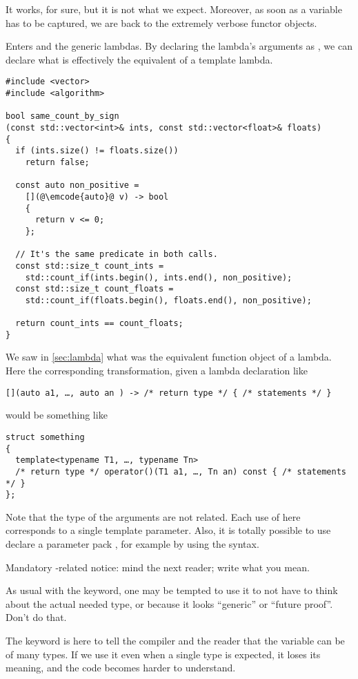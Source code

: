 It works, for sure, but it is not what we expect. Moreover, as soon as
a variable has to be captured, we are back to the extremely verbose
functor objects.

\solutiontitle

Enters  and the generic lambdas. By declaring the lambda's
arguments as , we can declare what is effectively the
equivalent of a template lambda.

\begin{lstlisting}
#include <vector>
#include <algorithm>

bool same_count_by_sign
(const std::vector<int>& ints, const std::vector<float>& floats)
{
  if (ints.size() != floats.size())
    return false;

  const auto non_positive =
    [](@\emcode{auto}@ v) -> bool
    {
      return v <= 0;
    };

  // It's the same predicate in both calls.
  const std::size_t count_ints =
    std::count_if(ints.begin(), ints.end(), non_positive);
  const std::size_t count_floats =
    std::count_if(floats.begin(), floats.end(), non_positive);

  return count_ints == count_floats;
}
\end{lstlisting}

We saw in \ref{sec:lambda} what was the equivalent function object of
a lambda. Here the corresponding transformation, given a lambda
declaration like

\begin{lstlisting}
[](auto a1, …, auto an ) -> /* return type */ { /* statements */ }
\end{lstlisting}

would be something like

\begin{lstlisting}
struct something
{
  template<typename T1, …, typename Tn>
  /* return type */ operator()(T1 a1, …, Tn an) const { /* statements */ }
};
\end{lstlisting}

Note that the type of the arguments are not related. Each use of
 here corresponds to a single template parameter. Also, it
is totally possible to use declare a parameter pack
, for example by using the 
syntax.

\begin{guideline}
Mandatory -related notice: mind the next reader; write what
you mean.

\bigskip

As usual with the  keyword, one may be tempted to use it to
not have to think about the actual needed type, or because it looks
``generic'' or ``future proof''. Don't do that.

The  keyword is here to tell the compiler and the reader
that the variable can be of many types. If we use it even when a
single type is expected, it loses its meaning, and the code becomes
harder to understand.
\end{guideline}
